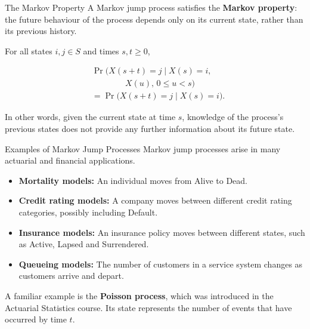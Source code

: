 \documentclass[
  ignorenonframetext,
  aspectratio=169,
]{beamer}
\providecommand{\tightlist}{%
  \setlength{\itemsep}{0pt}\setlength{\parskip}{0pt}}
\begin{document}
\begin{frame}{The Markov Property}
\protect{}\label{the-markov-property}
A Markov jump process satisfies the \textbf{Markov property}: the future
behaviour of the process depends only on its current state, rather than
its previous history.

For all states \(i,j\in S\) and times \(s,t\geq 0\),

\[
\begin{aligned}
&\Pr\bigl(X(s+t)=j\mid X(s)=i,\\
&\qquad\qquad X(u),\,0\leq u<s\bigr)\\
&=\Pr\bigl(X(s+t)=j\mid X(s)=i\bigr).
\end{aligned}
\]

In other words, given the current state at time \(s\), knowledge of the
process's previous states does not provide any further information about
its future state.
\end{frame}

\begin{frame}{Examples of Markov Jump Processes}
\protect{}\label{examples-of-markov-jump-processes}
Markov jump processes arise in many actuarial and financial
applications.

\begin{itemize}
\tightlist
\item
  \textbf{Mortality models:} An individual moves from Alive to Dead.
\item
  \textbf{Credit rating models:} A company moves between different
  credit rating categories, possibly including Default.
\item
  \textbf{Insurance models:} An insurance policy moves between different
  states, such as Active, Lapsed and Surrendered.
\item
  \textbf{Queueing models:} The number of customers in a service system
  changes as customers arrive and depart.
\end{itemize}

A familiar example is the \textbf{Poisson process}, which was introduced
in the Actuarial Statistics course. Its state represents the number of
events that have occurred by time \(t\).
\end{frame}
\end{document}

